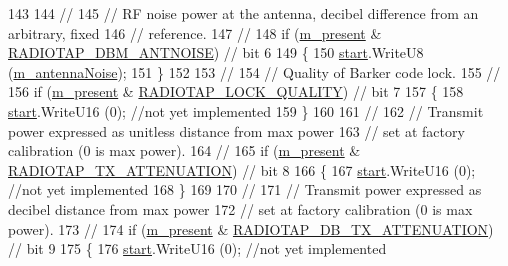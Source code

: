 \begin{DoxyCode}
143 
144   \textcolor{comment}{//}
145   \textcolor{comment}{// RF noise power at the antenna, decibel difference from an arbitrary, fixed}
146   \textcolor{comment}{// reference.}
147   \textcolor{comment}{//}
148   \textcolor{keywordflow}{if} (\hyperlink{classns3_1_1RadiotapHeader_a8b8aca212245ad4ad1aa796d4cc802bb}{m\_present} & \hyperlink{classns3_1_1RadiotapHeader_afd15dfe66387dfbcbf62865d024f58ffae23bc8a9f7c31fed309f83d9fb47303e}{RADIOTAP\_DBM\_ANTNOISE}) \textcolor{comment}{// bit 6}
149     \{
150       \hyperlink{namespacevisualizer_1_1core_a2a35e5d8a34af358b508dac8635754e0}{start}.WriteU8 (\hyperlink{classns3_1_1RadiotapHeader_aff9eb044c000563934b7b88edad4ef17}{m\_antennaNoise});
151     \}
152 
153   \textcolor{comment}{//}
154   \textcolor{comment}{// Quality of Barker code lock.}
155   \textcolor{comment}{//}
156   \textcolor{keywordflow}{if} (\hyperlink{classns3_1_1RadiotapHeader_a8b8aca212245ad4ad1aa796d4cc802bb}{m\_present} & \hyperlink{classns3_1_1RadiotapHeader_afd15dfe66387dfbcbf62865d024f58ffaf7e272e231381bb96c1249d3e5bc3f34}{RADIOTAP\_LOCK\_QUALITY}) \textcolor{comment}{// bit 7}
157     \{
158       \hyperlink{namespacevisualizer_1_1core_a2a35e5d8a34af358b508dac8635754e0}{start}.WriteU16 (0); \textcolor{comment}{//not yet implemented}
159     \}
160 
161   \textcolor{comment}{//}
162   \textcolor{comment}{// Transmit power expressed as unitless distance from max power}
163   \textcolor{comment}{// set at factory calibration (0 is max power).}
164   \textcolor{comment}{//}
165   \textcolor{keywordflow}{if} (\hyperlink{classns3_1_1RadiotapHeader_a8b8aca212245ad4ad1aa796d4cc802bb}{m\_present} & \hyperlink{classns3_1_1RadiotapHeader_afd15dfe66387dfbcbf62865d024f58ffac37dba53d249adeeb099272e90737893}{RADIOTAP\_TX\_ATTENUATION}) \textcolor{comment}{// bit 8}
166     \{
167       \hyperlink{namespacevisualizer_1_1core_a2a35e5d8a34af358b508dac8635754e0}{start}.WriteU16 (0); \textcolor{comment}{//not yet implemented}
168     \}
169 
170   \textcolor{comment}{//}
171   \textcolor{comment}{// Transmit power expressed as decibel distance from max power}
172   \textcolor{comment}{// set at factory calibration (0 is max power).}
173   \textcolor{comment}{//}
174   \textcolor{keywordflow}{if} (\hyperlink{classns3_1_1RadiotapHeader_a8b8aca212245ad4ad1aa796d4cc802bb}{m\_present} & \hyperlink{classns3_1_1RadiotapHeader_afd15dfe66387dfbcbf62865d024f58ffa9711d2d12b4ba6ff71a85711e2c8b5da}{RADIOTAP\_DB\_TX\_ATTENUATION}) \textcolor{comment}{// bit 9}
175     \{
176       \hyperlink{namespacevisualizer_1_1core_a2a35e5d8a34af358b508dac8635754e0}{start}.WriteU16 (0); \textcolor{comment}{//not yet implemented}

\end{DoxyCode}
